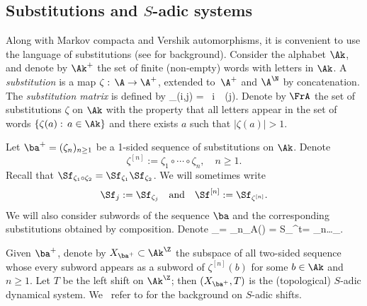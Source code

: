 \subsection{Substitutions and $S$-adic systems} \label{sec-Sadic}
Along with Markov compacta and Vershik automorphisms, it is convenient to use the language of {substitutions} (see \cite{Queff,Fogg} for background). Consider the
alphabet $\Ak$, and denote by $\Ak^+$ the set of finite (non-empty) words with letters in $\Ak$. A \emph{substitution} is a map $\zeta:\,\A\to \A^+$, extended to~$\A^+$ and $\A^{\N}$ by concatenation.
The \emph{substitution matrix} is defined by
\be \label{sub-mat}
\Sf_\zeta (i,j) = \ i\ \ \zeta(j).
\ee
Denote by $\FrA$ the set of substitutions $\zeta$ on $\Ak$ with the property that all letters appear in the set of words $\{\zeta(a):\,a\in \Ak\}$ and there exists $a$ such that $|\zeta(a)|>1$.

Let $\ba^+ =(\zeta_n)_{n\ge 1}$ be a 1-sided sequence of substitutions on $\Ak$. Denote
\[
\zeta^{[n]} := \zeta_1\circ \cdots\circ\zeta_n,\quad n\ge 1.
\]
Recall that $\Sf_{\zeta_1\circ \zeta_2} = \Sf_{\zeta_1}\Sf_{\zeta_2}$.
We will sometimes write
\[
\Sf_j:= \Sf_{\zeta_j}\quad \text{and}\quad \Sf^{[n]}:= \Sf_{\zeta^{[n]}}.
\]
We will also consider subwords of the sequence $\ba$ and the corresponding substitutions obtained by composition. Denote
\be \label{notation1}
\Sf_\bq = \Sf_n\cdots \Sf_\ell\quad {}\quad A(\bq) = S_\bq^t\quad {}\bq = \zeta_{n}\ldots\zeta_{\ell}.
\ee

Given $\ba^+$, denote by $X_{\ba^+}\subset \Ak^\Z$ the subspace of all two-sided sequence whose every subword appears as a subword of
$\zeta^{[n]}(b)$ for some $b\in \Ak$ and $n\ge 1$. Let $T$ be the left shift on $\Ak^\Z$; then $(X_{\ba^+},T)$ is the (topological) $S$-adic dynamical system.
We~ refer to \cite{BD,BST_2019,BSTY} for the background on $S$-adic shifts.

